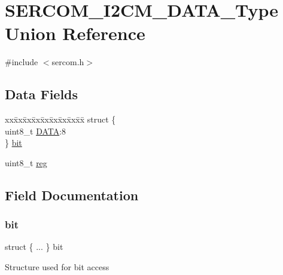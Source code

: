 \hypertarget{union_s_e_r_c_o_m___i2_c_m___d_a_t_a___type}{}\section{S\+E\+R\+C\+O\+M\+\_\+\+I2\+C\+M\+\_\+\+D\+A\+T\+A\+\_\+\+Type Union Reference}
\label{union_s_e_r_c_o_m___i2_c_m___d_a_t_a___type}


{\ttfamily \#include $<$sercom.\+h$>$}

\subsection*{Data Fields}
\begin{DoxyCompactItemize}
\item 
\begin{tabbing}
xx\=xx\=xx\=xx\=xx\=xx\=xx\=xx\=xx\=\kill
struct \{\\
\>uint8\_t \mbox{\hyperlink{union_s_e_r_c_o_m___i2_c_m___d_a_t_a___type_a16a414d747fa31fade2c82eb140875e1}{DATA}}:8\\
\} \mbox{\hyperlink{union_s_e_r_c_o_m___i2_c_m___d_a_t_a___type_ae9dfa83c7218f6f736491c1bf65ae550}{bit}}\\

\end{tabbing}\item 
uint8\+\_\+t \mbox{\hyperlink{union_s_e_r_c_o_m___i2_c_m___d_a_t_a___type_a9428adc9af4653a2050e2536b55dec8d}{reg}}
\end{DoxyCompactItemize}


\subsection{Field Documentation}
\mbox{\label{union_s_e_r_c_o_m___i2_c_m___d_a_t_a___type_ae9dfa83c7218f6f736491c1bf65ae550}} 
\subsubsection{\texorpdfstring{bit}{bit}}
{\footnotesize\ttfamily struct \{ ... \}   bit}

Structure used for bit access \mbox{\label{union_s_e_r_c_o_m___i2_c_m___d_a_t_a___type_a16a414d747fa31fade2c82eb140875e1}} 

